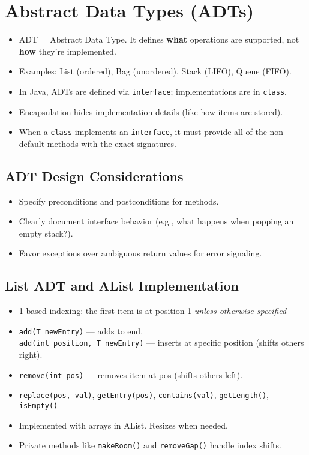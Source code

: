 \documentclass[11pt]{article}
\begin{document}
\section*{Abstract Data Types (ADTs)}
\begin{itemize}[leftmargin=*]
\item ADT = Abstract Data Type. It defines \textbf{what} operations are supported, not \textbf{how} they're implemented.
\item Examples: List (ordered), Bag (unordered), Stack (LIFO), Queue (FIFO).
\item In Java, ADTs are defined via \texttt{interface}; implementations are in \texttt{class}.
\item Encapsulation hides implementation details (like how items are stored).
\item When a \texttt{class} implements an \texttt{interface}, it must provide all of the non-default methods with the exact signatures.

\end{itemize}

\subsection*{ADT Design Considerations}
\begin{itemize}
  \item Specify preconditions and postconditions for methods.
  \item Clearly document interface behavior (e.g., what happens when popping an empty stack?).
  \item Favor exceptions over ambiguous return values for error signaling.
\end{itemize}


\subsection*{List ADT and AList Implementation}
\begin{itemize}[leftmargin=*]
\item 1-based indexing: the first item is at position 1 \textit{unless otherwise specified}
\item \texttt{add(T newEntry)} — adds to end. \\
\texttt{add(int position, T newEntry)} — inserts at specific position (shifts others right).
\item \texttt{remove(int pos)} — removes item at pos (shifts others left).
\item \texttt{replace(pos, val)}, \texttt{getEntry(pos)}, \texttt{contains(val)}, \texttt{getLength()}, \texttt{isEmpty()}
\item Implemented with arrays in AList. Resizes when needed.
\item Private methods like \texttt{makeRoom()} and \texttt{removeGap()} handle index shifts.
\end{itemize}
\end{document}
